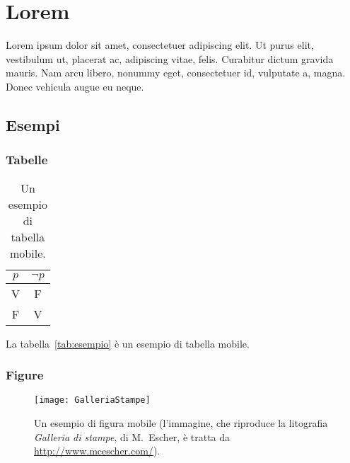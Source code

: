 
\chapter{Lorem}
\label{cap:lorem}

Lorem ipsum dolor sit amet, consectetuer adipiscing elit. Ut purus elit, vestibulum ut, placerat ac, adipiscing vitae, felis. Curabitur dictum gravida mauris. Nam arcu libero, nonummy eget, consectetuer id, vulputate a, magna. Donec vehicula augue eu neque.

\section{Esempi}

\subsection{Tabelle}

\lipsum

\begin{table}[tb]
\caption[Un esempio di tabella mobile]{Un esempio di tabella mobile.}
\label{tab:esempio}
\centering
\begin{tabular}{cc}
\toprule
$p$ & $\lnot p$ \\ 
\midrule
V   & F \\ 
F   & V \\
\bottomrule 
\end{tabular}
\end{table}

La tabella~\vref{tab:esempio} è un esempio di tabella mobile.

\lipsum[1-2]


\subsection{Figure}

\lipsum[2]

\begin{figure}[tb] 
\centering 
\texttt{[image: GalleriaStampe]} 
\caption[Un esempio di figura mobile]{Un esempio di figura mobile (l'immagine, che riproduce la litografia \emph{Galleria di stampe}, di M.~Escher, è tratta da \url{http://www.mcescher.com/}).}
\label{fig:galleria} 
\end{figure}

